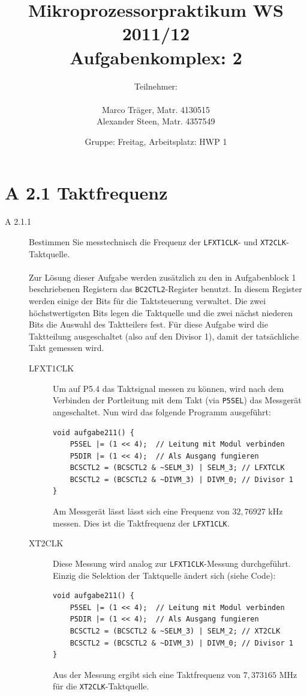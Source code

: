 \documentclass[11pt,a4paper,ngerman]{article}
\author{Teilnehmer:\\ \\Marco Träger, Matr. 4130515\\Alexander Steen, Matr. 4357549}
\date{Gruppe: Freitag, Arbeitsplatz: HWP 1}
\title{Mikroprozessorpraktikum WS 2011/12\\ Aufgabenkomplex: 2}
\begin{document}

\maketitle
\thispagestyle{fancy}
\newpage
\section*{A 2.1 Taktfrequenz}

\begin{description}
	\item[A 2.1.1] Bestimmen Sie messtechnisch die Frequenz der \texttt{LFXT1CLK}- und \texttt{XT2CLK}-Taktquelle. \\ \\
	Zur Lösung dieser Aufgabe werden zusätzlich zu den in Aufgabenblock 1 beschriebenen Registern das \texttt{BC2CTL2}-Register benutzt. In diesem Register werden einige der Bits für die Taktsteuerung verwaltet. Die zwei höchstwertigsten Bits legen die Taktquelle und die zwei nächst niederen Bits die Auswahl des Taktteilers fest. Für diese Aufgabe wird die Taktteilung ausgeschaltet (also auf den Divisor 1), damit der tatsächliche Takt gemessen wird.
		\begin{description}
			\item[LFXT1CLK] Um auf P5.4 das Taktsignal messen zu können, wird nach dem Verbinden der Portleitung mit dem Takt (via \texttt{P5SEL}) das Messgerät angeschaltet. Nun wird das folgende Programm ausgeführt:
\begin{lstlisting}
void aufgabe211() {
    P5SEL |= (1 << 4);	// Leitung mit Modul verbinden
    P5DIR |= (1 << 4);	// Als Ausgang fungieren
    BCSCTL2 = (BCSCTL2 & ~SELM_3) | SELM_3; // LFXTCLK
    BCSCTL2 = (BCSCTL2 & ~DIVM_3) | DIVM_0; // Divisor 1
}
\end{lstlisting}
			Am Messgerät lässt lässt sich eine Frequenz von $32,76927$ kHz messen. Dies ist die Taktfrequenz der \texttt{LFXT1CLK}.
			\item[XT2CLK]  Diese Messung wird analog zur \texttt{LFXT1CLK}-Messung durchgeführt. Einzig die Selektion der Taktquelle ändert sich (siehe Code):
\begin{lstlisting}
void aufgabe211() {
    P5SEL |= (1 << 4);	// Leitung mit Modul verbinden
    P5DIR |= (1 << 4);	// Als Ausgang fungieren
    BCSCTL2 = (BCSCTL2 & ~SELM_3) | SELM_2; // XT2CLK
    BCSCTL2 = (BCSCTL2 & ~DIVM_3) | DIVM_0; // Divisor 1
}	
\end{lstlisting}
			Aus der Messung ergibt sich eine Taktfrequenz von $7,373165$ MHz für die \texttt{XT2CLK}-Taktquelle.
		\end{description}
	


\end{description}
\end{document}
